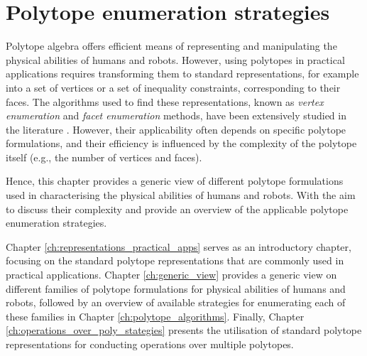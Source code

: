 

\chapter{Polytope enumeration strategies}

Polytope algebra offers efficient means of representing and manipulating the physical abilities of humans and robots. However, using polytopes in practical applications requires transforming them to standard representations, for example into a set of vertices or a set of inequality constraints, corresponding to their faces. The algorithms used to find these representations, known as \textit{vertex enumeration} and \textit{facet enumeration} methods, have been extensively studied in the literature \cite{fukuda2004frequently}. However, their applicability often depends on specific polytope formulations, and their efficiency is influenced by the complexity of the polytope itself (e.g., the number of vertices and faces).

Hence, this chapter provides a generic view of different polytope formulations used in characterising the physical abilities of humans and robots. With the aim to discuss their complexity and provide an overview of the applicable polytope enumeration strategies.

Chapter \ref{ch:representations_practical_apps} serves as an introductory chapter, focusing on the standard polytope representations that are commonly used in practical applications. Chapter \ref{ch:generic_view} provides a generic view on different families of polytope formulations for physical abilities of humans and robots, followed by an overview of available strategies for enumerating each of these families in Chapter \ref{ch:polytope_algorithms}. Finally, Chapter \ref{ch:operations_over_poly_stategies} presents the utilisation of standard polytope representations for conducting operations over multiple polytopes.


